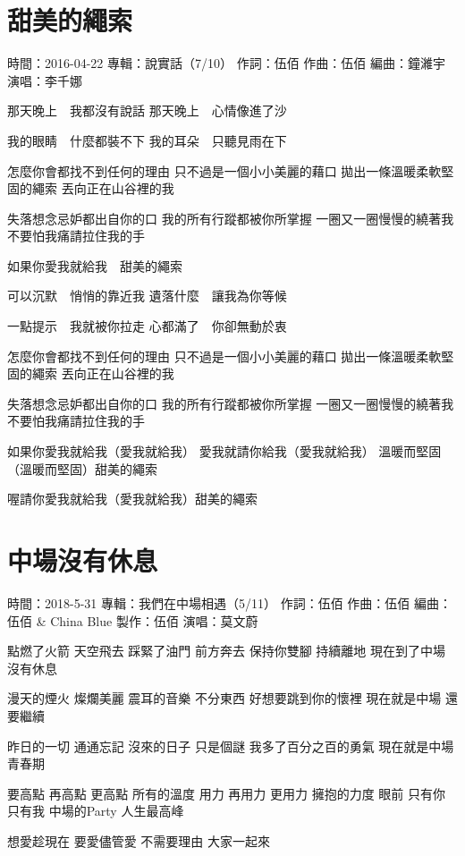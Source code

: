 \documentclass[UTF8,a4paper,oneside,twocolumn,12pt]{ctexbook}
\newcommand{\infopair}[2]{\textbullet #1：#2}
\newcommand{\zc}[1][伍佰]{\infopair{作詞}{#1}}
\newcommand{\zq}[1][伍佰]{\infopair{作曲}{#1}}
\newcommand{\bq}[1][伍佰]{\infopair{編曲}{#1}}
\newcommand{\zj}[1]{\infopair{專輯}{#1}}
\newcommand{\zz}[1]{\infopair{製作}{#1}}
\newcommand{\sj}[1]{\infopair{時間}{#1}}
\newenvironment{info}{\begin{flushleft}\kaishu
	}
	{\end{flushleft}\normalsize\yahei\par}
\newenvironment{lyric}{
	}
{}
\begin{document}
\section{甜美的繩索}
\begin{info}
	\sj{2016-04-22}
	\zj{說實話（7/10）}
	\zc
	\zq
	\bq[鐘濰宇]
	\infopair{演唱}{李千娜}
\end{info}
\begin{lyric}
	那天晚上　我都沒有說話
	那天晚上　心情像進了沙

	我的眼睛　什麼都裝不下
	我的耳朵　只聽見雨在下

	怎麼你會都找不到任何的理由
	只不過是一個小小美麗的藉口
	拋出一條溫暖柔軟堅固的繩索
	丟向正在山谷裡的我

	失落想念忌妒都出自你的口
	我的所有行蹤都被你所掌握
	一圈又一圈慢慢的繞著我
	不要怕我痛請拉住我的手

	如果你愛我就給我　甜美的繩索

	可以沉默　悄悄的靠近我
	遺落什麼　讓我為你等候

	一點提示　我就被你拉走
	心都滿了　你卻無動於衷

	怎麼你會都找不到任何的理由
	只不過是一個小小美麗的藉口
	拋出一條溫暖柔軟堅固的繩索
	丟向正在山谷裡的我

	失落想念忌妒都出自你的口
	我的所有行蹤都被你所掌握
	一圈又一圈慢慢的繞著我
	不要怕我痛請拉住我的手

	如果你愛我就給我（愛我就給我）
	愛我就請你給我（愛我就給我）
	溫暖而堅固（溫暖而堅固）甜美的繩索

	喔請你愛我就給我（愛我就給我）甜美的繩索
\end{lyric}

\section{中場沒有休息}
\begin{info}
	\sj{2018-5-31}
	\zj{我們在中場相遇（5/11）}
	\zc
	\zq
	\bq[伍佰 \& China Blue]
	\zz{伍佰}
	\infopair{演唱}{莫文蔚}
\end{info}
\begin{lyric}
	點燃了火箭 天空飛去
	踩緊了油門 前方奔去
	保持你雙腳 持續離地
	現在到了中場 沒有休息

	漫天的煙火 燦爛美麗
	震耳的音樂 不分東西
	好想要跳到你的懷裡
	現在就是中場 還要繼續

	昨日的一切 通通忘記
	沒來的日子 只是個謎
	我多了百分之百的勇氣
	現在就是中場青春期

	要高點 再高點 更高點 所有的溫度
	用力 再用力 更用力 擁抱的力度
	眼前 只有你 只有我 中場的Party
	人生最高峰

	想愛趁現在 要愛儘管愛
	不需要理由 大家一起來
\end{lyric}
\end{document}
